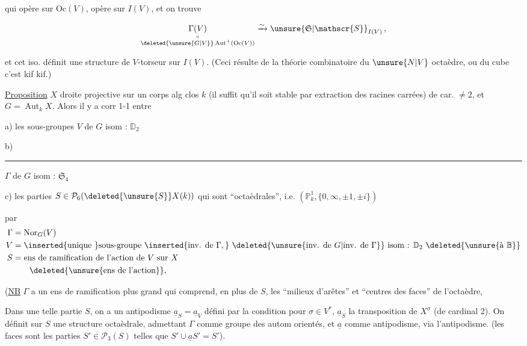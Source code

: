 
qui opère sur $\mathrm{Oc}(V)$, opère sur $I(V)$, et on trouve

\[
\underset{\substack{\shortparallel\\\deleted{\unsure{G|V}}\operatorname{Aut}^{+}(\mathrm{Oc}(V))}}{\Gamma(V)}
\xrightarrow{\sim}\unsure{\mathfrak{S}|\mathscr{S}}_{I(V)}\,,
\]

et cet iso.  définit une structure de $V$-torseur sur $I(V)$. (Ceci résulte de la théorie combinatoire du $\unsure{N|V}$ octaèdre, ou du cube c'est kif kif.)

\uline{Proposition}  $X$ droite projective  sur un corps alg clos $k$ (il suffit qu'il  soit stable par extraction des racines carrées) de car. $\ne 2$, et $G=\operatorname{Aut}_{k}X$. Alors il y a corr 1-1 entre

a) les sous-groupes $V$ de $G$ isom : $\mathbb{D}_2$

b) \rule{5em}{0.4pt} $\Gamma$ de $G$ isom : $\mathfrak{S}_4$ 

c) les parties $S\in\mathcal{P}_6(\deleted{\unsure{S}}X(k))$ qui sont ``octaèdrales'', i.e.   $(\mathbb P^1_k,\{0,\infty,\pm1,\pm i\})$

par
\[
\begin{aligned}
\Gamma&=\operatorname{Nor}_{G}(V)\\
V&=\inserted{\text{unique }}\text{sous-groupe }\inserted{\text{inv. de }\Gamma,}\ \deleted{\unsure{\text{inv. de }G|\text{inv. de }\Gamma}}\ \text{isom : }\mathbb D_2\ \deleted{\unsure{\text{à }\mathbb B}}\\
S&=\text{ens de ramification de l'action de }V\text{ sur }X\\
&\hspace{2em}\deleted{\unsure{\text{ens de l'action}}},
\end{aligned}
\]


(\uline{NB} $\Gamma$ a un ens de ramification plus grand qui comprend, en plus de $S$, les ``milieux d'arêtes'' et ``centres des faces'' de l'octaèdre,

Dans une telle partie $S$, on a un antipodisme $\underline{a}_S=\underline{a}_V$ défini par la condition  pour $\sigma\in V^*$, $\underline{a}_S$   la transposition de $X^\sigma$ (de cardinal 2). On définit sur $S$ une structure octaèdrale, admettant $\Gamma$ comme groupe des autom orientés, et $\underline a$ comme antipodisme, via l'antipodisme. (les faces sont les parties $S'\in\mathcal{P}_3(S)$ telles que $S'\cup\underline a S'=S'$).
